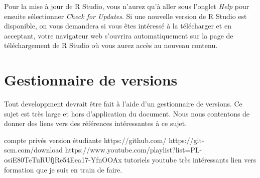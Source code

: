 \vspace{\baselineskip}
Pour la mise à jour de R Studio, vous n'aurez qu'à aller sous l'onglet \emph{Help} pour ensuite sélectionner \emph{Check for Updates}. Si une nouvelle version de R Studio est disponible, on vous demandera si vous êtes intéressé à la télécharger et en acceptant, votre navigateur web s'ouvrira automatiquement sur la page de téléchargement de R Studio où vous aurez accès au nouveau contenu. 

\section{Gestionnaire de versions}
Tout developpment devrait être fait à l'aide d'un gestionnaire de versions. Ce sujet est très large et hors d'application du document. Nous nous contentons de donner des liens vers des références intéressantes à ce sujet.

compte privés
version étudiante
https://github.com/
https://git-scm.com/download
https://www.youtube.com/playlist?list=PL-osiE80TeTuRUfjRe54Eea17-YfnOOAx
tutoriels youtube très intéressants
lien vers formation que je suis en train de faire.